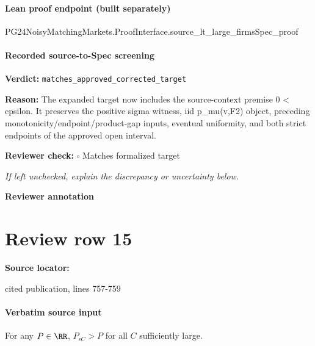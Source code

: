 \documentclass[10pt]{article}
\newcommand{\reviewerbox}{%
  \par\noindent\fbox{\parbox{0.96\linewidth}{\rule{0pt}{0.38in}}}\par
}
\newcommand{\reviewmatch}[1]{%
  \par\noindent\textbf{Reviewer check:} $\square$\; #1\par
  \noindent\emph{If left unchecked, explain the discrepancy or uncertainty below.}\par
}
\begin{document}
\paragraph{Lean proof endpoint (built separately)}\begin{ReviewVerbatim}
PG24NoisyMatchingMarkets.ProofInterface.source_lt_large_firmsSpec_proof
\end{ReviewVerbatim}

\paragraph{Recorded source-to-Spec screening}
\textbf{Verdict:} \texttt{matches\_approved\_corrected\_target}
\\
{\raggedright
\textbf{Reason:} The expanded target now includes the source-\allowbreak{}context premise 0 < epsilon.\allowbreak{} It preserves the positive sigma witness, iid p\_\allowbreak{}mu(v,F2) object, preceding monotonicity/\allowbreak{}endpoint/\allowbreak{}product-\allowbreak{}gap inputs, eventual uniformity, and both strict endpoints of the approved open interval.\allowbreak{}
\par}
\reviewmatch{Matches formalized target}
\noindent\textbf{Reviewer annotation}\par
\reviewerbox
\clearpage
\hypertarget{source-claim-ff22377c4e341e25}{}
\section*{Review row 15}
\textbf{Source locator:} {\footnotesize\raggedright cited publication, lines 757-\allowbreak{}759\par}
\paragraph{Verbatim source input}
\begin{ReviewVerbatim}
\begin{lemma}\label{lem:unbounded-cutoffs}
    For any $P\in \RR$, $P_{\epsilon C} > P$ for all $C$ sufficiently large.
\end{lemma}
\end{ReviewVerbatim}
\end{document}
